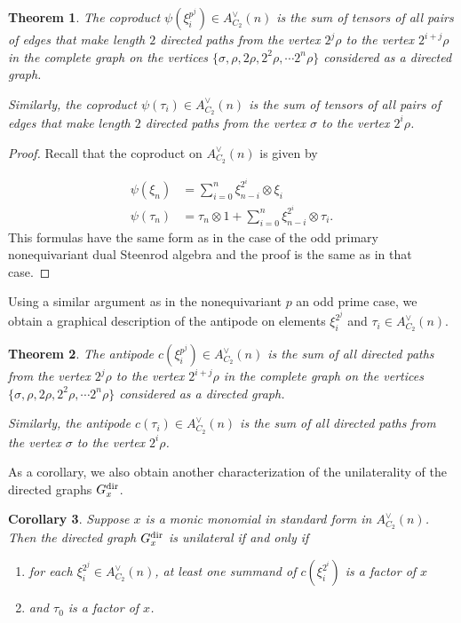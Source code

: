 \documentclass{amsart}
\newtheorem{theorem}{Theorem}[section]
\newtheorem{cor}[theorem]{Corollary}
\theoremstyle{definition}
\theoremstyle{plain}
\numberwithin{theorem}{section}
\numberwithin{equation}{section}
\numberwithin{figure}{section}
\newcommand{\0}{\langle 0 \rangle }
\begin{document}
\begin{theorem} \label{thm:coprodC2} 
     The coproduct $\psi(\xi_i^{p^j}) \in A^\vee_{C_2}(n)$ is the sum of tensors of all pairs of edges that make length $2$ directed paths from the vertex $2^j \rho $ to the vertex $2^{i + j} \rho$ in the complete graph on the vertices $\{\sigma, \rho, 2 \rho, 2^2 \rho, \cdots 2^n \rho\}$ considered as a directed graph.
     
    Similarly, the coproduct $\psi(\tau_i) \in A_{C_2}^\vee(n)$ is the sum of tensors of all pairs of edges that make length $2$ directed paths from the vertex $\sigma$ to the vertex $2^i \rho$. \color{black}
\end{theorem}

\begin{proof}
Recall that the coproduct on $A_{C_2}^\vee(n)$ is given by

\begin{align*}
    \psi(\xi_n) & =\sum_{i=0}^n \xi_{n-i}^{2^i} \otimes \xi_i \\ 
    \psi (\tau_n) & = \tau_n \otimes 1 + \sum_{i=0}^n \xi_{n-i}^{2^i} \otimes \tau_i.
\end{align*}
This formulas have the same form as in the case of the odd primary nonequivariant dual Steenrod algebra and the proof is the same as in that case.
\end{proof}

Using a similar argument as in the nonequivariant $p$ an odd prime case, we obtain a graphical description of the antipode on elements $\xi_i^{2^j}$ and $\tau_i \in A_{C_2}^\vee (n)$.

\begin{theorem} \label{thm:AntipodeC2} 
    The antipode $c(\xi_i^{p^j}) \in A^\vee_{C_2}(n)$ is the sum of all directed paths from the vertex $2^j \rho$ to the vertex $2^{i + j} \rho$ in the complete graph on the vertices $\{\sigma, \rho, 2 \rho, 2^2 \rho, \cdots 2^n \rho\}$ considered as a directed graph.

    Similarly, the antipode $c(\tau_i) \in A^\vee_{C_2}(n)$ is the sum of all directed paths from the vertex $\sigma$ to the vertex $2^i \rho$. \color{black}
\end{theorem}

As a corollary, we also obtain another characterization of the unilaterality of the directed graphs $G_x^\textup{dir}$.

\begin{cor} \label{cor:unilatC2}
    Suppose $x$ is a monic monomial { in standard form} in $A_{C_2}^\vee (n)$. Then the directed graph $G_x^{\textup{dir}}$ is unilateral if and only if
    \begin{enumerate}
        \item for each $\xi_i^{2^j} \in A_{C_2}^\vee (n)$, at least one summand of $c(\xi_i^{2^i})$ is a factor of $x$
        \item and $\tau_0$ is a factor of $x$.
    \end{enumerate}
\end{cor}

\printbibliography
\end{document}
